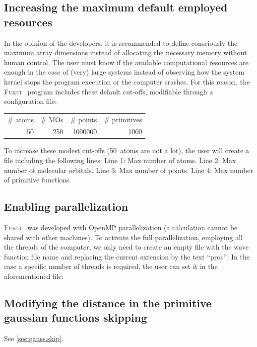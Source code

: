 \documentclass[a4paper,11pt,openany]{memoir}
\newcommand\programa{\textsc{Fukui}}
\begin{document}
\subsection{Increasing the maximum default employed resources}\label{subsec:resources}
In the opinion of the developers, it is recommended to define consciously the maximum array dimensions instead of allocating the necessary memory without human control. The user must know if the available computational resources are enough in the case of (very) large systems instead of observing how the system kernel stops the program execution or the computer crashes. For this reason, the \programa~ program includes these default cut-offs, modifiable through a configuration file:
\begin{center}
	\begin{tabular}{rrrr}
			\toprule
				{\# atoms}	&	{\# MOs}	&	{\# points}	&	{\# primitives}	\\
				50			&	250		&	1000000		&	1000			\\
			\bottomrule
		\end{tabular}
\end{center}

To increase these modest cut-offs (\SI{50}{atoms} are not a lot), the user will create a file including the following lines:
Line 1: Max number of atoms.
Line 2: Max number of molecular orbitals.
Line 3: Max number of points.
Line 4: Max number of primitive functions.

\subsection{Enabling parallelization}
\programa~ was developed with OpenMP parallelization (a calculation cannot be shared with other machines). To activate the full parallelization, employing all the threads of the computer, we only need to create an empty file with the wave function file name and replacing the current extension by the text ``proc'':
In the case a specific number of threads is required, the user can set it in the aforementioned file:

\subsection{Modifying the distance in the primitive gaussian functions skipping}
See \autoref{sec:gauss.skip}.
\end{document}
